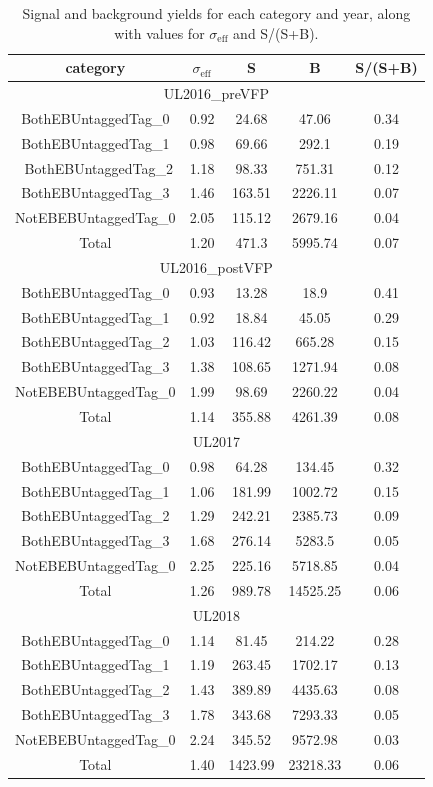 \begin{table}[]
\centering
\begin{tabular}{ccccc}
  \hline
  \hline
    category & $\sigma_{\textrm{eff}}$ & S & B & S/(S+B) \\
\hline
\multicolumn{5}{c}{UL2016\_preVFP} \\
\hline
BothEBUntaggedTag\_0 & 0.92 & 24.68 & 47.06 & 0.34 \\
BothEBUntaggedTag\_1 & 0.98 & 69.66 & 292.1 & 0.19 \\\
BothEBUntaggedTag\_2 & 1.18 & 98.33 & 751.31 & 0.12 \\
BothEBUntaggedTag\_3 & 1.46 & 163.51 & 2226.11 & 0.07 \\
NotEBEBUntaggedTag\_0 & 2.05 & 115.12 & 2679.16 & 0.04 \\
Total & 1.20 & 471.3 & 5995.74 & 0.07 \\
    \hline
\multicolumn{5}{c}{UL2016\_postVFP} \\
	\hline
BothEBUntaggedTag\_0 & 0.93 & 13.28 & 18.9 & 0.41 \\
BothEBUntaggedTag\_1 & 0.92 & 18.84 & 45.05 & 0.29 \\
BothEBUntaggedTag\_2 & 1.03 & 116.42 & 665.28 & 0.15 \\
BothEBUntaggedTag\_3 & 1.38 & 108.65 & 1271.94 & 0.08 \\
NotEBEBUntaggedTag\_0 & 1.99 & 98.69 & 2260.22 & 0.04 \\
Total & 1.14 & 355.88 & 4261.39 & 0.08 \\
    \hline
\multicolumn{5}{c}{UL2017} \\
\hline
BothEBUntaggedTag\_0 & 0.98 & 64.28 & 134.45 & 0.32 \\
BothEBUntaggedTag\_1 & 1.06 & 181.99 & 1002.72 & 0.15 \\
BothEBUntaggedTag\_2 & 1.29 & 242.21 & 2385.73 & 0.09 \\
BothEBUntaggedTag\_3 & 1.68 & 276.14 & 5283.5 & 0.05 \\
NotEBEBUntaggedTag\_0 & 2.25 & 225.16 & 5718.85 & 0.04 \\
Total & 1.26 & 989.78 & 14525.25 & 0.06 \\
    \hline
\multicolumn{5}{c}{UL2018} \\
	\hline
BothEBUntaggedTag\_0 & 1.14 & 81.45 & 214.22 & 0.28 \\
BothEBUntaggedTag\_1 & 1.19 & 263.45 & 1702.17 & 0.13 \\
BothEBUntaggedTag\_2 & 1.43 & 389.89 & 4435.63 & 0.08 \\
BothEBUntaggedTag\_3 & 1.78 & 343.68 & 7293.33 & 0.05 \\
NotEBEBUntaggedTag\_0 & 2.24 & 345.52 & 9572.98 & 0.03 \\
Total & 1.40 & 1423.99 & 23218.33 & 0.06 \\
\hline
\hline
\end{tabular}
\caption[Signal and background yields]{Signal and background yields for each category and year, along with values for $\sigma_{\textrm{eff}}$ and S/(S+B).}
\label{tab:yields}
\end{table}
